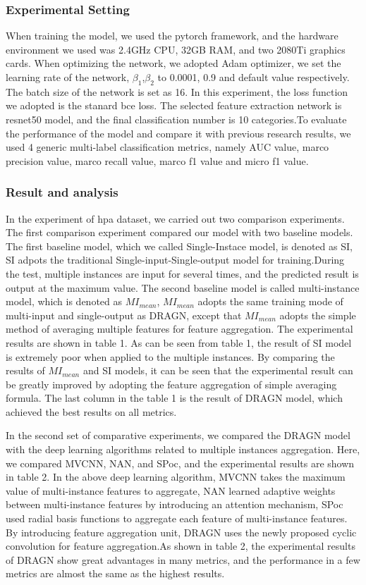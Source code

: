 \documentclass[10pt,twocolumn,letterpaper]{article}
\begin{document}
\subsubsection{Experimental Setting}
When training the model, we used the pytorch framework, and the hardware environment we used was 2.4GHz CPU, 32GB RAM, and two 2080Ti graphics cards. When optimizing the network, we adopted Adam optimizer\cite{ref25}, we set the learning rate of the network, $\beta_1$,$\beta_2$ to 0.0001, 0.9 and default value respectively. The batch size of the network is set as 16. In this experiment, the loss function we adopted is the stanard bce loss. The selected feature extraction network is resnet50 model, and the final classification number is 10 categories.To evaluate the performance of the model and compare it with previous research results, we used 4 generic multi-label classification metrics, namely AUC value, marco precision value, marco recall value, marco f1 value and micro f1 value.

\subsubsection{Result and analysis}
In the experiment of hpa dataset, we carried out two comparison experiments. The first comparison experiment compared our model with two baseline models. The first baseline model, which we called Single-Instace model, is denoted as SI, SI adpots the traditional Single-input-Single-output model for training.During the test, multiple instances are input for several times, and the predicted result is output at the maximum value. The second baseline model is called multi-instance model, which is denoted as $MI_{mean}$, $MI_{mean}$ adopts the same training mode of multi-input and single-output as DRAGN, except that $MI_{mean}$ adopts the simple method of averaging multiple features for feature aggregation. The experimental results are shown in table 1. As can be seen from table 1, the result of SI model is extremely poor when applied to the multiple instances. By comparing the results of $MI_{mean}$ and SI models, it can be seen that the experimental result can be greatly improved by adopting the feature aggregation of simple averaging formula. The last column in the table 1 is the result of DRAGN model, which achieved the best results on all metrics.

In the second set of comparative experiments, we compared the DRAGN model with the deep learning algorithms related to multiple instances aggregation. Here, we compared MVCNN, NAN, and SPoc\cite{ref28}, and the experimental results are shown in table 2. In the above deep learning algorithm, MVCNN takes the maximum value of multi-instance features to aggregate, NAN learned adaptive weights between multi-instance features by introducing an attention mechanism, SPoc used radial basis functions to aggregate each feature of multi-instance features. By introducing feature aggregation unit, DRAGN uses the newly proposed cyclic convolution for feature aggregation.As shown in table 2, the experimental results of DRAGN show great advantages in many metrics, and the performance in a few metrics are almost the same as the highest results.
\end{document}
